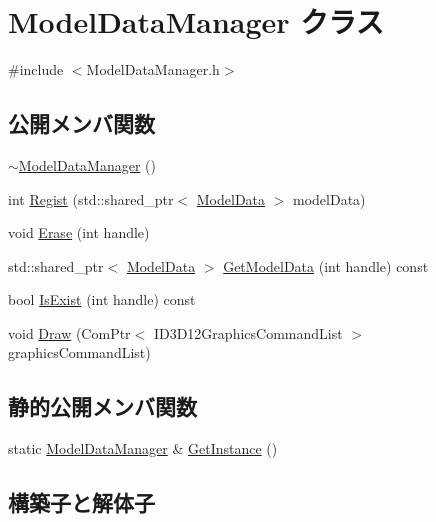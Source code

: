 \hypertarget{class_model_data_manager}{}\section{Model\+Data\+Manager クラス}
\label{class_model_data_manager}


{\ttfamily \#include $<$Model\+Data\+Manager.\+h$>$}

\subsection*{公開メンバ関数}
\begin{DoxyCompactItemize}
\item 
\mbox{\hyperlink{class_model_data_manager_ad8a24b96d273af9e717e7cc4b68cf399}{$\sim$\+Model\+Data\+Manager}} ()
\item 
int \mbox{\hyperlink{class_model_data_manager_a20b9312e019c39c633d6429e1209d1b7}{Regist}} (std\+::shared\+\_\+ptr$<$ \mbox{\hyperlink{class_model_data}{Model\+Data}} $>$ model\+Data)
\item 
void \mbox{\hyperlink{class_model_data_manager_aaa1dc0669900e8dc8186ae075133ba24}{Erase}} (int handle)
\item 
std\+::shared\+\_\+ptr$<$ \mbox{\hyperlink{class_model_data}{Model\+Data}} $>$ \mbox{\hyperlink{class_model_data_manager_a5f823590ae9c9eac222a7b107d14634b}{Get\+Model\+Data}} (int handle) const
\item 
bool \mbox{\hyperlink{class_model_data_manager_a69c14318f17547e1145b714a613732bc}{Is\+Exist}} (int handle) const
\item 
void \mbox{\hyperlink{class_model_data_manager_a9c2d9c3a70323f7d486fb42de162d303}{Draw}} (Com\+Ptr$<$ I\+D3\+D12\+Graphics\+Command\+List $>$ graphics\+Command\+List)
\end{DoxyCompactItemize}
\subsection*{静的公開メンバ関数}
\begin{DoxyCompactItemize}
\item 
static \mbox{\hyperlink{class_model_data_manager}{Model\+Data\+Manager}} \& \mbox{\hyperlink{class_model_data_manager_aee0cb9bcad096186bd2902620d1ac780}{Get\+Instance}} ()
\end{DoxyCompactItemize}


\subsection{構築子と解体子}
\mbox{\label{class_model_data_manager_ad8a24b96d273af9e717e7cc4b68cf399}} 
